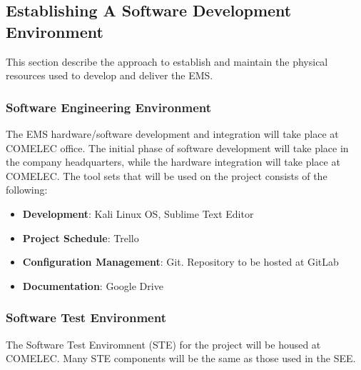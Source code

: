 \documentclass[a4paper, 11pt]{article}
\begin{document}
\subsection{Establishing A Software Development Environment}
This section describe the approach to establish and maintain the physical resources used to develop and deliver the EMS.

\subsubsection{Software Engineering Environment}
The EMS hardware/software development and integration will take place at COMELEC office. The initial phase of software development will take place in the company headquarters, while the hardware integration will take place at COMELEC. The tool sets that will be used on the project consists of the following:
\begin{itemize}
	\item \textbf{Development}: Kali Linux OS, Sublime Text Editor
	\item \textbf{Project Schedule}: Trello
	\item \textbf{Configuration Management}: Git. Repository to be hosted at GitLab
	\item \textbf{Documentation}: Google Drive
\end{itemize}

\subsubsection{Software Test Environment}
The Software Test Enviromnent (STE) for the project will be housed at COMELEC. Many STE components will be the same as those used in the SEE.
\end{document}

